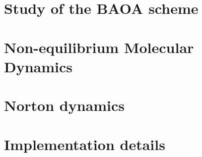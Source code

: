 \documentclass[a4paper,10pt,twoside]{report}
\newcommand{\1}{\mathbbm{1}}
\begin{document}
\chapter{Study of the BAOA scheme}

\chapter{Non-equilibrium Molecular Dynamics}

\chapter{Norton dynamics}


\appendix
\chapter{Implementation details}


\printbibliography
\end{document}
